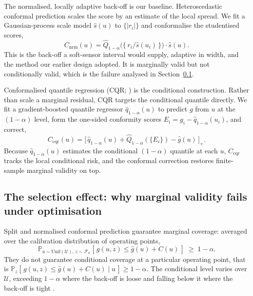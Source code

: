 \documentclass[review,times]{elsarticle}
\begin{document}
The normalised, locally adaptive back-off is our baseline. Heteroscedastic conformal
prediction \citep{lei2018} scales the score by an estimate of the local spread. We fit a
Gaussian-process scale model $\hat s(u)$ to $\{|r_i|\}$ and conformalise the studentised
scores,
\begin{equation*}
C_{\mathrm{nrm}}(u) = \widehat Q_{1-\alpha}\!\big(\{\,r_i/\hat s(u_i)\,\}\big)\cdot\hat s(u).
\end{equation*}
This is the back-off a soft-sensor interval would supply, adaptive in width, and the method
our earlier design adopted. It is marginally valid but not conditionally valid, which is the
failure analysed in Section~\ref{sec:methods-selection}.

Conformalised quantile regression (CQR; \citealt{romano2019}) is the conditional
construction. Rather than scale a marginal residual, CQR targets the conditional quantile
directly. We fit a gradient-boosted quantile regressor $\hat q_{1-\alpha}(u)$ to predict $g$
from $u$ at the $(1-\alpha)$ level, form the one-sided conformity scores
$E_i=g_i-\hat q_{1-\alpha}(u_i)$, and correct,
\begin{equation*}
C_{\mathrm{cqr}}(u) = \big[\,\hat q_{1-\alpha}(u) + \widehat Q_{1-\alpha}(\{E_i\}) - \hat g(u)\,\big]_+ .
\end{equation*}
Because $\hat q_{1-\alpha}(u)$ estimates the conditional $(1-\alpha)$ quantile at each $u$,
$C_{\mathrm{cqr}}$ tracks the local conditional risk, and the conformal correction restores
finite-sample marginal validity on top.

\subsection{The selection effect: why marginal validity fails under optimisation}
\label{sec:methods-selection}

Split and normalised conformal prediction guarantee marginal coverage: averaged over the
calibration distribution of operating points,
\begin{equation}
\mathbb{P}_{u\sim\mathrm{Unif}(\mathcal U),\,z\sim\mathcal F_\sigma}\!\left[\,g(u,z)\le \hat g(u)+C(u)\,\right]\;\ge\;1-\alpha .
\label{eq:marginal}
\end{equation}
They do not guarantee conditional coverage at a particular operating point, that is
$\mathbb{P}_{z}[\,g(u,z)\le\hat g(u)+C(u)\mid u\,]\ge 1-\alpha$. The conditional level varies
over $\mathcal U$, exceeding $1-\alpha$ where the back-off is loose and falling below it where
the back-off is tight \citep{gibbscherian2023}.
\end{document}
